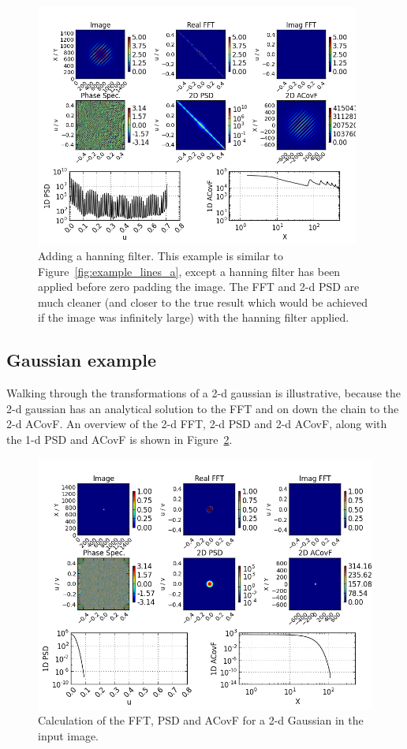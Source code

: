 \documentclass[11pt,preprint]{aastex}
\begin{document}
\begin{figure}[htbp]
\centering
\includegraphics[width=4.2in]{example_lines_b}
\caption{{\small
Adding a hanning filter. This example is similar to Figure~\ref{fig:example_lines_a}, except a hanning filter has been applied before zero padding the image. The FFT and 2-d PSD are much cleaner (and closer to the true result which would be achieved if the image was infinitely large) with the hanning filter applied. }}
 \label{fig:example_lines_b}
\end{figure}


\subsection{Gaussian example}

Walking through the transformations of a 2-d gaussian is illustrative, because the 2-d gaussian has an analytical solution to the FFT and on down the chain to the 2-d ACovF.  An overview of the 2-d FFT, 2-d PSD and 2-d ACovF, along with the 1-d PSD and ACovF is shown in Figure~\ref{fig:gauss_all}. 

\begin{figure}[htbp]
\centering
\includegraphics[width=5in]{gauss_all}
\caption{{\small
Calculation of the FFT, PSD and ACovF for a 2-d Gaussian in the input image. }}
\label{fig:gauss_all}
\end{figure}
\end{document}
